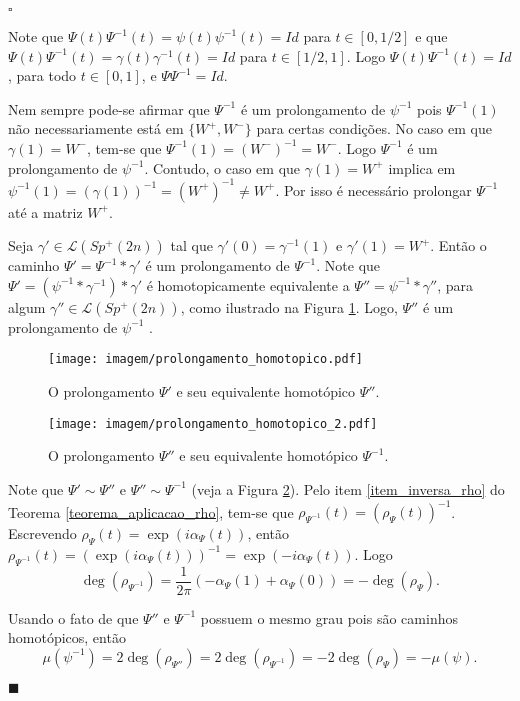 \documentclass[12pt]{book}
\newenvironment{prova}[1]{$\square$ #1}{\hfill$\blacksquare$}
\newcommand{\caminhos}{\mathcal{L}}
\newcommand{\gruposimpleticonaodegenerado}[1]{Sp^{#1}(2n)}
\newcommand{\intervalo}{[0,1]}
\begin{document}
\begin{prova}
\begin{enumerate}
			Note que $\Psi(t)\Psi^{-1}(t) = \psi(t)\psi^{-1}(t) = Id$ para $t \in [0,1/2]$ e que $\Psi(t)\Psi^{-1}(t) = \gamma(t)\gamma^{-1}(t) = Id$ para $t \in [1/2,1]$. Logo $\Psi(t)\Psi^{-1}(t) = Id$, para todo $t \in \intervalo$, e $\Psi\Psi^{-1} = Id$.
			
			Nem sempre pode-se afirmar que $\Psi^{-1}$ é um prolongamento de $\psi^{-1}$ pois $\Psi^{-1}(1)$ não necessariamente está em $\{W^{+},W^{-}\}$ para certas condições. No caso em que $\gamma(1)=W^{-}$, tem-se que $\Psi^{-1}(1) = (W^{-})^{-1}=W^{-}$. Logo $\Psi^{-1}$ é um prolongamento de $\psi^{-1}$. Contudo, o caso em que $\gamma(1)=W^{+}$ implica em $\psi^{-1}(1)= (\gamma(1))^{-1}=(W^{+})^{-1} \neq W^{+}$. Por isso é necessário prolongar $\Psi^{-1}$ até a matriz $W^{+}$.
			
			Seja $\gamma'\in \caminhos(\gruposimpleticonaodegenerado{+})$ tal que $\gamma'(0) = \gamma^{-1}(1)$ e $\gamma'(1)=W^{+}$. Então o caminho $\Psi'=\Psi^{-1}*\gamma'$ é um prolongamento de $\Psi^{-1}$. Note que $\Psi' = (\psi^{-1}*\gamma^{-1})*\gamma'$ é homotopicamente equivalente a $\Psi'' = \psi^{-1}*\gamma''$, para algum $\gamma''\in \caminhos(\gruposimpleticonaodegenerado{+})$, como ilustrado na Figura	 \ref{figura_prolongamento_homotopico}. Logo, $\Psi''$ é um prolongamento de $\psi^{-1}$ .  
			
			\begin{figure}[!h]
				\centering
				\texttt{[image: imagem/prolongamento\_homotopico.pdf]}
				\caption{O prolongamento $\Psi'$ e seu equivalente homotópico $\Psi''$.}
				\label{figura_prolongamento_homotopico}
			\end{figure}
			
			\begin{figure}[!h]
				\centering
				\texttt{[image: imagem/prolongamento\_homotopico\_2.pdf]}
				\caption{O prolongamento $\Psi''$ e seu equivalente homotópico $\Psi^{-1}$.}
				\label{figura_prolongamento_homotopico_2}
			\end{figure}
			
			
			
			Note que $\Psi'\sim \Psi''$ e $\Psi''\sim \Psi^{-1}$ (veja a Figura \ref{figura_prolongamento_homotopico_2}). Pelo item \ref{item_inversa_rho} do Teorema \ref{teorema_aplicacao_rho}, tem-se que $\rho_{\Psi^{-1}}(t) = (\rho_{\Psi}(t))^{-1}$. Escrevendo $\rho_{\Psi}(t) = \exp(i\alpha_{\Psi}(t))$, então $\rho_{\Psi^{-1}}(t) =(\exp(i\alpha_{\Psi}(t)))^{-1}= \exp(-i\alpha_{\Psi}(t))$. Logo 
			$$
			\deg(\rho_{\Psi^{-1}})=\frac{1}{2\pi}(-\alpha_{\Psi}(1)+\alpha_{\Psi}(0)) =  -\deg(\rho_{\Psi}).
			$$
			
			Usando o fato de que $\Psi''$ e $\Psi^{-1}$ possuem o mesmo grau pois são caminhos homotópicos, então
			$$
			\mu(\psi^{-1})=2\deg(\rho_{\Psi''}) = 2\deg(\rho_{\Psi^{-1}}) = -2\deg(\rho_{\Psi})= -\mu(\psi).
			$$
		\end{enumerate}
	\end{prova}
\end{document}
